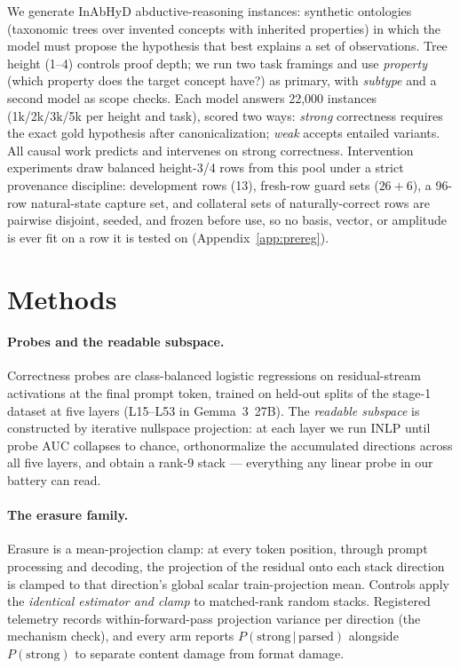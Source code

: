 \documentclass{article} %
\begin{document}
We generate InAbHyD abductive-reasoning instances: synthetic ontologies
(taxonomic trees over invented concepts with inherited properties) in
which the model must propose the hypothesis that best explains a set of
observations. Tree height (1--4) controls proof depth; we run two task
framings and use \emph{property} (which property does the target
concept have?) as primary, with \emph{subtype} and a second model as
scope checks. Each model answers 22{,}000 instances (1k/2k/3k/5k per
height and task), scored two ways: \emph{strong} correctness requires
the exact gold hypothesis after canonicalization; \emph{weak} accepts
entailed variants. All causal work predicts and intervenes on strong
correctness. Intervention experiments draw balanced height-3/4 rows
from this pool under a strict provenance discipline: development rows
(13), fresh-row guard sets ($26{+}6$), a 96-row natural-state capture
set, and collateral sets of naturally-correct rows are pairwise
disjoint, seeded, and frozen before use, so no basis, vector, or
amplitude is ever fit on a row it is tested on
(Appendix~\ref{app:prereg}).

\section{Methods}\label{sec:methods}

\paragraph{Probes and the readable subspace.} Correctness probes are
class-balanced logistic regressions on residual-stream activations at
the final prompt token, trained on held-out splits of the stage-1
dataset at five layers (L15--L53 in Gemma~3~27B). The \emph{readable
subspace} is constructed by iterative nullspace projection: at each
layer we run INLP until probe AUC collapses to chance, orthonormalize
the accumulated directions across all five layers, and obtain a rank-9
stack --- everything any linear probe in our battery can read.

\paragraph{The erasure family.} Erasure is a mean-projection clamp: at
every token position, through prompt processing and decoding, the
projection of the residual onto each stack direction is clamped to that
direction's global scalar train-projection mean. Controls apply the
\emph{identical estimator and clamp} to matched-rank random stacks.
Registered telemetry records within-forward-pass projection variance
per direction (the mechanism check), and every arm reports
$P(\text{strong}\,|\,\text{parsed})$ alongside $P(\text{strong})$ to
separate content damage from format damage.
\end{document}
